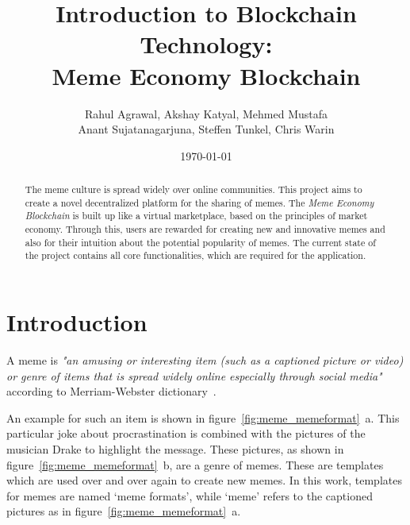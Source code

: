 \documentclass[12pt]{article}
\title{Introduction to Blockchain Technology:\\
    Meme Economy Blockchain}
\date{\today}
\author{Rahul Agrawal, Akshay Katyal, Mehmed Mustafa\\
Anant Sujatanagarjuna, Steffen Tunkel, Chris Warin}
\begin{document}
\maketitle
\thispagestyle{empty}
\begin{abstract}%
The meme culture is spread widely over online communities. This project aims to create a novel decentralized platform for the sharing of memes. The \textit{Meme Economy Blockchain} is built up like a virtual marketplace, based on the principles of market economy. Through this, users are rewarded for creating new and innovative memes and also for their intuition about the potential popularity of memes. The current state of the project contains all core functionalities, which are required for the application.


\end{abstract}

\newpage
\tableofcontents
\newpage




\section{Introduction} \label{sec:Intro}%


A meme is \textit{"an amusing or interesting item (such as a captioned picture or video) or genre of items that is spread widely online especially through social media"} according to Merriam-Webster dictionary~\cite{meme_def}.
    
    An example for such an item is shown in figure~\ref{fig:meme_memeformat}~a. This particular joke about procrastination is combined with the pictures of the musician Drake to highlight the message. These pictures, as shown in figure~\ref{fig:meme_memeformat}~b, are a genre of memes. These are templates which are used over and over again to create new memes. In this work, templates for memes are named `meme formats', while `meme' refers to the captioned pictures as in figure~\ref{fig:meme_memeformat}~a.
\end{document}
